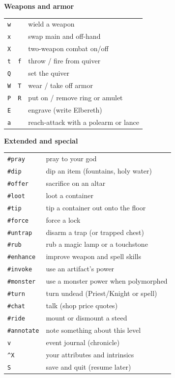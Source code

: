 \documentclass[openany,10pt]{book}
\begin{document}
\hfill
\begin{minipage}[t]{0.48\textwidth}
\textbf{Weapons and armor}\par\vspace{0.2em}
\begin{tabular}{@{}ll@{}}
\texttt{w} & wield a weapon\\
\texttt{x} & swap main and off-hand\\
\texttt{X} & two-weapon combat on/off\\
\texttt{t}\ \ \texttt{f} & throw / fire from quiver\\
\texttt{Q} & set the quiver\\
\texttt{W}\ \ \texttt{T} & wear / take off armor\\
\texttt{P}\ \ \texttt{R} & put on / remove ring or amulet\\
\texttt{E} & engrave (write Elbereth)\\
\texttt{a} & reach-attack with a polearm or lance\\
\end{tabular}

\vspace{0.9em}
\textbf{Extended and special}\par\vspace{0.2em}
\begin{tabular}{@{}ll@{}}
\texttt{\#pray} & pray to your god\\
\texttt{\#dip} & dip an item (fountains, holy water)\\
\texttt{\#offer} & sacrifice on an altar\\
\texttt{\#loot} & loot a container\\
\texttt{\#tip} & tip a container out onto the floor\\
\texttt{\#force} & force a lock\\
\texttt{\#untrap} & disarm a trap (or trapped chest)\\
\texttt{\#rub} & rub a magic lamp or a touchstone\\
\texttt{\#enhance} & improve weapon and spell skills\\
\texttt{\#invoke} & use an artifact's power\\
\texttt{\#monster} & use a monster power when polymorphed\\
\texttt{\#turn} & turn undead (Priest/Knight or spell)\\
\texttt{\#chat} & talk (shop price quotes)\\
\texttt{\#ride} & mount or dismount a steed\\
\texttt{\#annotate} & note something about this level\\
\texttt{v} & event journal (chronicle)\\
\texttt{\^{}X} & your attributes and intrinsics\\
\texttt{S} & save and quit (resume later)\\
\end{tabular}
\end{minipage}
\end{document}
